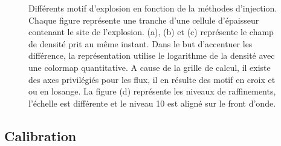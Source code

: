 \begin{figure}

    \caption[Test de Sedov - Tranches]{Différents motif d'explosion en fonction de la méthodes d'injection.
    Chaque figure représente une tranche d'une cellule d'épaisseur contenant le site de l'explosion.
    (a), (b) et (c) représente le champ de densité prit au même instant.
    Dans le but d'accentuer les différence, la représentation utilise le logarithme de la densité avec une colormap quantitative.
    A cause de la grille de calcul, il existe des axes privilégiés pour les flux, il en résulte des motif en croix et ou en losange.
    La figure (d) représente les niveaux de raffinements, l'échelle est différente et le niveau 10 est aligné sur le front d'onde.
    }
 	\label{fig:sedovslice}
\end{figure}

\subsection{Calibration}
\label{sec:sncali}

